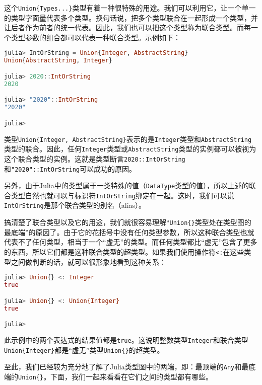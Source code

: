 这个\verb|Union{Types...}|类型有着一种很特殊的用途。我们可以利用它，让一个单一的类型字面量代表多个类型。换句话说，把多个类型联合在一起形成一个类型，并让后者作为前者的统一代表。因此，我们也可以把这个类型称为联合类型。而每一个类型参数的组合都可以代表一种联合类型。示例如下：

\begin{lstlisting}[language=julia]
julia> IntOrString = Union{Integer, AbstractString} 
Union{AbstractString, Integer}

julia> 2020::IntOrString
2020

julia> "2020"::IntOrString
"2020"

julia> 
\end{lstlisting}

类型\verb|Union{Integer, AbstractString}|表示的是\verb|Integer|类型和\verb|AbstractString|类型的联合。因此，任何\verb|Integer|类型或\verb|AbstractString|类型的实例都可以被视为这个联合类型的实例。这就是类型断言\verb|2020::IntOrString|和\verb|"2020"::IntOrString|可以成功的原因。

另外，由于Julia中的类型属于一类特殊的值（\verb|DataType|类型的值），所以上述的联合类型自然也就可以与标识符\verb|IntOrString|绑定在一起。这时，我们可以说\verb|IntOrString|是那个联合类型的别名（alias）。

搞清楚了联合类型以及它的用途，我们就很容易理解“\verb|Union{}|类型处在类型图的最底端”的原因了。由于它的花括号中没有任何类型参数，所以这种联合类型也就代表不了任何类型，相当于一个“虚无”的类型。而任何类型都比“虚无”包含了更多的东西，所以它们都是这种联合类型的超类型。如果我们使用操作符\verb|<:|在这些类型之间做判断的话，就可以很形象地看到这种关系：

\begin{lstlisting}[language=julia]
julia> Union{} <: Integer
true

julia> Union{} <: Union{Integer}
true

julia> 
\end{lstlisting}

此示例中的两个表达式的结果值都是\verb|true|。这说明整数类型\verb|Integer|和联合类型\verb|Union{Integer}|都是“虚无”类型\verb|Union{}|的超类型。

至此，我们已经较为充分地了解了Julia类型图中的两端，即：最顶端的\verb|Any|和最底端的\verb|Union{}|。下面，我们一起来看看在它们之间的类型都有哪些。
